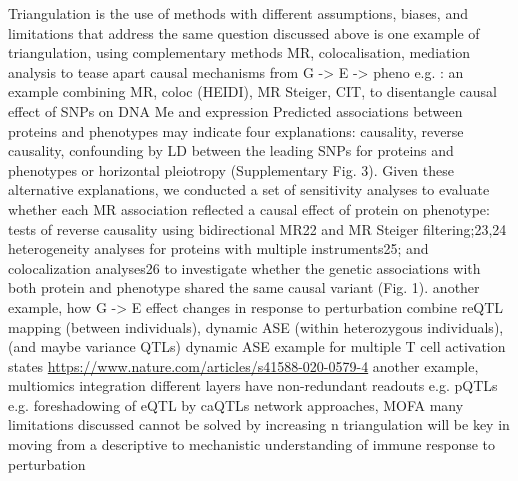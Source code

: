 \begin{outline}
\1 Triangulation is the use of methods with different assumptions, biases, and limitations that address the same question \autocite{munafo2018RobustResearchNeeds}
    \2 discussed above is one example of triangulation, using complementary methods MR, colocalisation, mediation analysis to tease apart causal mechanisms from G -> E -> pheno
        \3 e.g. \textcite{taylor2019IntegrativeAnalysisGene}: an example combining MR, coloc (HEIDI), MR Steiger, CIT, to disentangle causal effect of SNPs on DNA Me and expression
        \3 \autocite{zheng2019PhenomewideMendelianRandomization} Predicted associations between proteins and phenotypes may indicate four explanations: causality, reverse causality, confounding by LD between the leading SNPs for proteins and phenotypes or horizontal pleiotropy (Supplementary Fig. 3). Given these alternative explanations, we conducted a set of sensitivity analyses to evaluate whether each MR association reflected a causal effect of protein on phenotype: tests of reverse causality using bidirectional MR22 and MR Steiger filtering;23,24 heterogeneity analyses for proteins with multiple instruments25; and colocalization analyses26 to investigate whether the genetic associations with both protein and phenotype shared the same causal variant (Fig. 1). 
    \2 another example, how G -> E effect changes in response to perturbation
        \3 combine reQTL mapping (between individuals), dynamic ASE (within heterozygous individuals), (and maybe variance QTLs)
        \3 dynamic ASE example for multiple T cell activation states \url{https://www.nature.com/articles/s41588-020-0579-4}
    \1 another example, multiomics integration
        \2 different layers have non-redundant readouts
        \2 e.g. pQTLs
        \2 e.g. foreshadowing of eQTL by caQTLs 
        \2 network approaches, MOFA
\1 many limitations discussed cannot be solved by increasing n
\1 triangulation will be key in moving from a descriptive to mechanistic understanding of immune response to perturbation

\end{outline}

